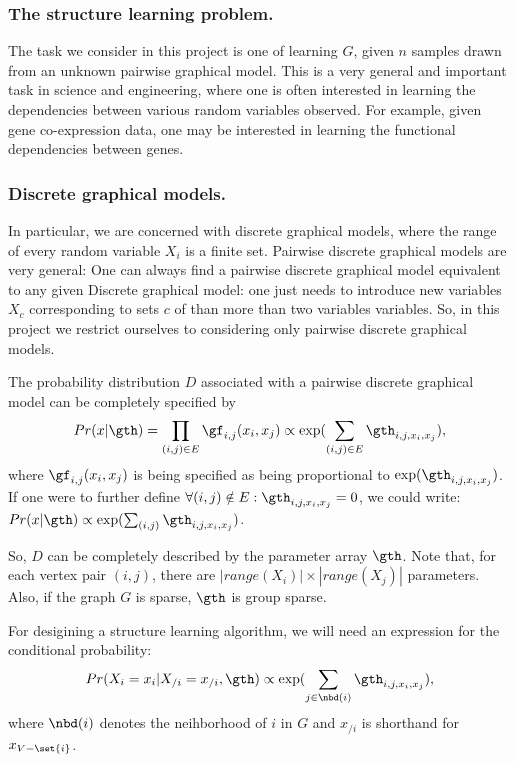 \documentclass{article}
\begin{document}
\subsubsection{The structure learning problem.}
The task we consider in this project is one of learning $G$, given $n$ samples drawn from an unknown pairwise graphical model. This is a very general and important task in science and engineering, where one is often interested in learning the dependencies between various random variables observed. For example, given gene co-expression data, one may be interested in learning the functional dependencies between genes.

\subsubsection{Discrete graphical models.}
\label{sec:Discrete graphical models.}
In particular, we are concerned with discrete graphical models, where the range of every random variable $X_i$ is a finite set. Pairwise discrete graphical models are very general: One can always find a pairwise discrete graphical model equivalent to any given Discrete graphical model: one just needs to introduce new variables $X_c$ corresponding to sets $c$ of than more than two variables variables. So, in this project we restrict ourselves to considering only pairwise discrete graphical models.

The probability distribution $D$ associated with a pairwise discrete graphical model can be completely specified by 
\begin{equation}
Pr(x|\gth) = \prod_{(i, j) \in E}\gf_{i, j}(x_i, x_j) \propto \exp(\sum_{(i, j)\in E} \gth_{i, j, x_i, x_j}),
\label{eqn:distributionDiscreteGM}
\end{equation}
where $\gf_{i, j}(x_i, x_j)$ is being specified as being proportional to $\exp(\gth_{i, j, x_i, x_j})$. If one were to further define $\forall (i, j) \notin E: \gth_{i, j, x_i, x_j} = 0$, we could write: $Pr(x|\gth) \propto \exp(\sum_{(i, j)} \gth_{i, j, x_i, x_j})$.

So, $D$ can be completely described by the parameter array $\gth$. Note that, for each vertex pair $(i, j)$, there are $|range(X_i)| \times |range(X_j)|$ parameters. Also, if the graph $G$ is sparse, $\gth$ is group sparse.

For desigining a structure learning algorithm, we will need an expression for the conditional probability:\\
\begin{equation}
Pr(X_i = x_i|X_{/i} = x_{/i}, \gth) \propto \exp(\sum_{j \in \nbd(i)} \gth_{i, j, x_i, x_j}),
\label{eqn:condProbabilityDiscrete}
\end{equation}
where $\nbd(i)$ denotes the neihborhood of $i$ in $G$ and $x_{/i}$ is shorthand for $x_{V-\set{i}}$.
\end{document}
